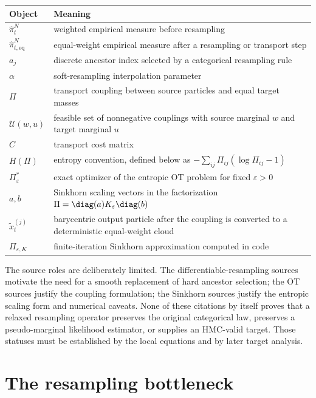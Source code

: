 \begin{center}
\small
\begin{tabular}{p{} p{}}
\toprule
Object & Meaning \\
\midrule
$\hat\pi_t^N$ & weighted empirical measure before resampling \\
$\hat\pi_{t,\mathrm{eq}}^N$ & equal-weight empirical measure after a
resampling or transport step \\
$a_j$ & discrete ancestor index selected by a categorical resampling rule \\
$\alpha$ & soft-resampling interpolation parameter \\
$\Pi$ & transport coupling between source particles and equal target masses \\
$\mathcal U(w,u)$ & feasible set of nonnegative couplings with source marginal
$w$ and target marginal $u$ \\
$C$ & transport cost matrix \\
$H(\Pi)$ & entropy convention, defined below as
$-\sum_{ij}\Pi_{ij}(\log \Pi_{ij}-1)$ \\
$\Pi_\varepsilon^*$ & exact optimizer of the entropic OT problem for fixed
$\varepsilon>0$ \\
$a,b$ & Sinkhorn scaling vectors in the factorization
$\Pi=\diag(a)K_\varepsilon\diag(b)$ \\
$\tilde x_t^{(j)}$ & barycentric output particle after the coupling is converted
to a deterministic equal-weight cloud \\
$\Pi_{\varepsilon,K}$ & finite-iteration Sinkhorn approximation computed in
code \\
\bottomrule
\end{tabular}
\end{center}

The source roles are deliberately limited.  The differentiable-resampling
sources motivate the need for a smooth replacement of hard ancestor selection;
the OT sources justify the coupling formulation; the Sinkhorn sources justify
the entropic scaling form and numerical caveats.  None of these citations by
itself proves that a relaxed resampling operator preserves the original
categorical law, preserves a pseudo-marginal likelihood estimator, or supplies
an HMC-valid target.  Those statuses must be established by the local equations
and by later target analysis.

\section{The resampling bottleneck}
\label{sec:bf-dr-bottleneck}

